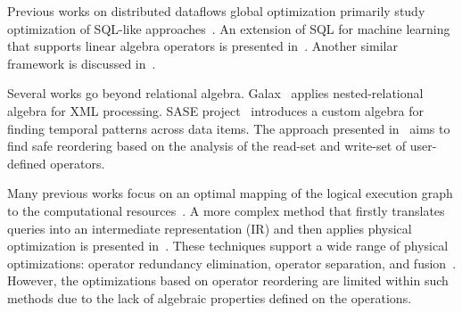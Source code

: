 Previous works on distributed dataflows global optimization primarily study optimization of SQL-like approaches~\cite{chang2014hawq, armbrust2015spark, sethi2019presto}. An extension of SQL for machine learning that supports linear algebra operators is presented in~\cite{schule2019mlearn}. Another similar framework is discussed in~\cite{schelter2016samsara}.

Several works go beyond relational algebra. Galax~\cite{re2006complete} applies nested-relational algebra for XML processing. SASE project~\cite{gyllstrom2006sase} introduces a custom algebra for finding temporal patterns across data items. The approach presented in~\cite{hueske2012opening} aims to find safe reordering based on the analysis of the read-set and write-set of user-defined operators.

Many previous works focus on an optimal mapping of the logical execution graph to the computational resources~\cite{grulich2020grizzly, davidson2013optimizing, bosagh2016matrix}. A more complex method that firstly translates queries into an intermediate representation (IR) and then applies physical optimization is presented in~\cite{kroll2019arc}. These techniques support a wide range of physical optimizations: operator redundancy elimination, operator separation, and fusion~\cite{hirzel2014catalog}. However, the optimizations based on operator reordering are limited within such methods due to the lack of algebraic properties defined on the operations.